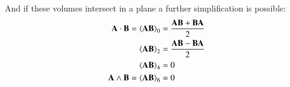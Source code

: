 \documentclass{article}      %
\newcommand{\gpgrade}[2] {{\left\langle{{#1}}\right\rangle}_{#2}}
\begin{document}
And if these volumes intersect in a plane a further simplification is possible:
\begin{align*}
\BA \cdot \BB = \gpgrade{\BA\BB}{0} &= \frac{\BA\BB + \BB\BA}{2} \\
\gpgrade{\BA\BB}{2} &= \frac{\BA\BB - \BB\BA}{2} \\
\gpgrade{\BA\BB}{4} &= 0 \\
\BA \wedge \BB = \gpgrade{\BA\BB}{6} &= 0 \\
\end{align*}
\end{document}
